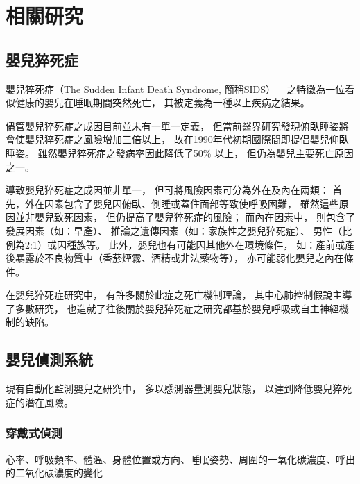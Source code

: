 \documentclass[class=NCU_thesis, crop=false]{standalone}
\begin{document}
\chapter{相關研究}

\section{嬰兒猝死症}
嬰兒猝死症（The Sudden Infant Death Syndrome, 簡稱SIDS）
~\cite{kinneyTheSuddenInfantDeathSyndrome2009}
之特徵為一位看似健康的嬰兒在睡眠期間突然死亡，
其被定義為一種以上疾病之結果。

儘管嬰兒猝死症之成因目前並未有一單一定義，
但當前醫界研究發現俯臥睡姿將會使嬰兒猝死症之風險增加三倍以上，
故在1990年代初期國際間即提倡嬰兒仰臥睡姿。
雖然嬰兒猝死症之發病率因此降低了50\% 以上，
但仍為嬰兒主要死亡原因之一。

導致嬰兒猝死症之成因並非單一，
但可將風險因素可分為外在及內在兩類：
首先，外在因素包含了嬰兒因俯臥、側睡或蓋住面部等致使呼吸困難，
雖然這些原因並非嬰兒致死因素，
但仍提高了嬰兒猝死症的風險；
而內在因素中，
則包含了發展因素（如：早產）、
推論之遺傳因素（如：家族性之嬰兒猝死症）、
男性（比例為2:1）或因種族等。
此外，嬰兒也有可能因其他外在環境條件，
如：產前或產後暴露於不良物質中（香菸煙霧、酒精或非法藥物等），
亦可能弱化嬰兒之內在條件。

在嬰兒猝死症研究中，
有許多關於此症之死亡機制理論，
其中心肺控制假說主導了多數研究，
也造就了往後關於嬰兒猝死症之研究都基於嬰兒呼吸或自主神經機制的缺陷。


\section{嬰兒偵測系統}
現有自動化監測嬰兒之研究中，
多以感測器量測嬰兒狀態，
以達到降低嬰兒猝死症的潛在風險。

\subsection{穿戴式偵測}
心率、呼吸頻率、體溫、身體位置或方向、睡眠姿勢、周圍的一氧化碳濃度、呼出的二氧化碳濃度的變化


\end{document}
